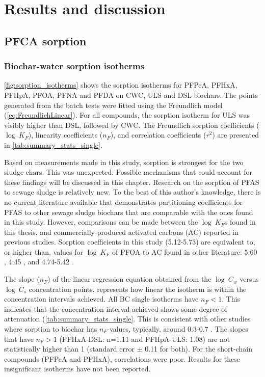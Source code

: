 \chapter{Results and discussion}\label{chap:Results&Disc}
\section{PFCA sorption}
\subsection{Biochar-water sorption isotherms}
\cref{fig:sorption_isotherms} shows the sorption isotherms for PFPeA, PFHxA, PFHpA, PFOA, PFNA and PFDA on CWC, ULS and DSL biochars. The points generated from the batch tests were fitted using the Freundlich model (\cref{eq:FreundlichLinear}). For all compounds, the sorption isotherm for ULS was visibly higher than DSL, followed by CWC. The Freundlich sorption coefficients ($\log~K_F$), linearity coefficients ($n_F$), and correlation coefficients ($r^2$) are presented in \cref{tab:summary_stats_single}. 

Based on measurements made in this study, sorption is strongest for the two sludge chars. This was unexpected. Possible mechanisms that could account for these findings will be discussed in this chapter. Research on the sorption of PFAS to sewage sludge is relatively new. To the best of this author's knowledge, there is no current literature available that demonstrates partitioning coefficients for PFAS to other sewage sludge biochars that are comparable with the ones found in this study. However, comparisons can be made between the $\log~K_F$s found in this thesis, and commercially-produced activated carbons (AC) reported in previous studies. Sorption coefficients in this study (5.12-5.73) are equivalent to, or higher than, values for $\log~K_F$ of PFOA to AC found in other literature: 5.60 \citep{Kupryianchyk2016b}, 4.45 \citep{hansen2010sorption}, and 4.74-5.42 \citep{silvani2019can}. 

The slope ($n_F$) of the linear regression equation obtained from the $\log~C_w$ versus $\log~C_s$ concentration points, represents how linear the isotherm is within the concentration intervals achieved. All BC single isotherms have $n_F<1$. This indicates that the concentration interval achieved shows some degree of attenuation (\cref{tab:summary_stats_single}. This is consistent with other studies where sorption to biochar has $n_F$-values, typically, around 0.3-0.7 \citep{Cornelissen2005}. The slopes that have $n_F>1$ (PFHxA-DSL: n=1.11 and PFHpA-ULS: 1.08) are not statistically higher than 1 (standard error $\pm$ 0.11 for both). For the short-chain compounds (PFPeA and PFHxA), correlations were poor. Results for these insignificant isotherms have not been reported. 

